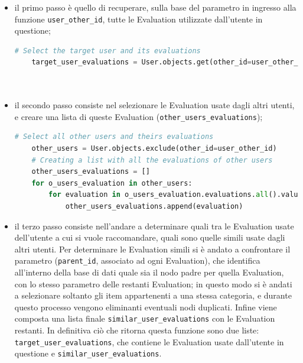 \begin{itemize}
    \item il primo passo è quello di recuperare, sulla base del parametro in ingresso alla funzione \texttt{user\_other\_id}, 
    tutte le Evaluation utilizzate dall'utente in questione;
    \lstset{style=python_code_style}
    \begin{lstlisting}[language=Python, label=lst:UB_CF_2]
    # Select the target user and its evaluations
    target_user_evaluations = User.objects.get(other_id=user_other_id).evaluations.all()\
                                                                        .values('other_id', 'parent_id')\
                                                                        .order_by('other_id')
    \end{lstlisting}
    \item il secondo passo consiste nel selezionare le Evaluation usate dagli altri utenti, e creare una lista di queste Evaluation 
    (\texttt{other\_users\_evaluations});
    \lstset{style=python_code_style}
    \begin{lstlisting}[language=Python, label=lst:UB_CF_3]
    # Select all other users and theirs evaluations
    other_users = User.objects.exclude(other_id=user_other_id)
    # Creating a list with all the evaluations of other users
    other_users_evaluations = []
    for o_users_evaluation in other_users:
        for evaluation in o_users_evaluation.evaluations.all().values('other_id', 'parent_id').order_by('other_id'):
            other_users_evaluations.append(evaluation)
    \end{lstlisting}
    \item il terzo passo consiste nell'andare a determinare quali tra le Evaluation usate dell'utente a cui si vuole raccomandare, quali sono quelle 
    simili usate dagli altri utenti. Per determinare le Evaluation simili si è andato a confrontare il parametro (\texttt{parent\_id}, 
    associato ad ogni Evaluation), che identifica all'interno della base di dati quale sia il nodo padre per quella Evaluation, con lo stesso 
    parametro delle restanti Evaluation; in questo modo si è andati a selezionare soltanto gli item appartenenti a una stessa categoria, e 
    durante questo processo vengono eliminanti eventuali nodi duplicati. Infine viene composta una lista finale \texttt{similar\_user\_evaluations} 
    con le Evaluation restanti.
    In definitiva ciò che ritorna questa funzione sono due liste: \texttt{target\_user\_evaluations}, che contiene le Evaluation usate dall'utente 
    in questione e \texttt{similar\_user\_evaluations}.

\end{itemize}
